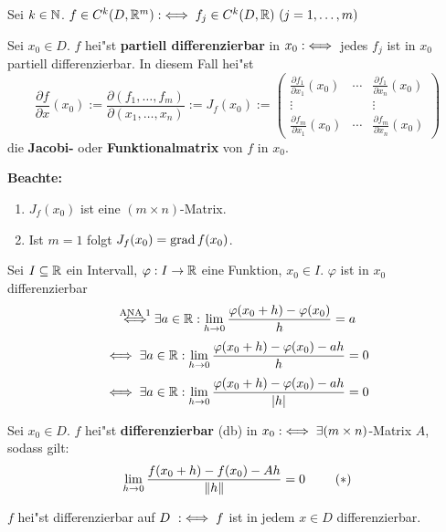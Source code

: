 \documentclass[a4paper,twoside,DIV15,BCOR12mm,chapterprefix=true,headings=twolinechapter]{scrbook}
\begin{document}
\begin{definition*}
\begin{liste}
\item Sei $k\in\mathbb{N}$. $f\in C^k(D,\MdR^m) :\equizu f_j\in C^k(D,\MdR)\ (j=1,\ldots,m)$
\item Sei $x_0\in D$. $f$ hei"st \textbf{partiell differenzierbar} in $x_0 :\iff$ jedes $f_j$ ist in $x_0$ partiell differenzierbar. In diesem Fall hei"st
$$\frac{\partial f}{\partial x}(x_0):=\frac{\partial(f_1,\ldots,f_m)}{\partial(x_1,\ldots,x_n)}:=J_f(x_0):=\begin{pmatrix}
\frac{\partial f_1}{\partial x_1}(x_0) & \cdots & \frac{\partial f_1}{\partial x_n}(x_0) \\
\vdots & & \vdots \\
\frac{\partial f_m}{\partial x_1}(x_0) & \cdots & \frac{\partial f_m}{\partial x_n}(x_0)
\end{pmatrix}$$
die \textbf{Jacobi-} oder \textbf{Funktionalmatrix} von $f$ in $x_0$.
\end{liste}
\textbf{Beachte:}
\begin{enumerate}
\item $J_f(x_0)$ ist eine $(m \times n)$-Matrix.
\item Ist $m=1$ folgt $J_f(x_0)=\mathop{\rm grad}\nolimits f(x_0)$.
\end{enumerate}
\end{definition*}

\begin{erinnerung}
Sei $I\subseteq\mathbb{R}$ ein Intervall, $\varphi:I\to\mathbb{R}$ eine Funktion, $x_0\in I$. $\varphi$ ist in $x_0$ differenzierbar
$$\overset{\text{ANA 1}}{\iff}\exists a \in\mathbb{R}: \displaystyle\lim_{h\to 0}\frac{\varphi(x_0+h)-\varphi(x_0)}{h}=a$$
$$\iff\exists a\in\mathbb{R}:\displaystyle\lim_{h\to 0}\frac{\varphi(x_0+h)-\varphi(x_0)-ah}{h}=0$$
$$\iff\exists a\in\mathbb{R}: \displaystyle\lim_{h\to 0}\frac{\varphi(x_0+h)-\varphi(x_0)-ah}{|h|}=0$$
\end{erinnerung}

\begin{definition*}
\begin{liste}
\item Sei $x_0\in D$. $f$ hei"st \textbf{differenzierbar} (db) in 
$x_0 :\iff \exists (m \times n)$-Matrix $A$, sodass gilt:
\begin{align*}
\displaystyle\lim_{h\to 0}\frac{f(x_0+h)-f(x_0)-Ah}{\|h\|}=0\ \tag{$*$}
\end{align*}
\item $f$ hei"st differenzierbar auf $D\ :\iff f$ ist in jedem $x\in D$ differenzierbar.
\end{liste}
\end{definition*}
\end{document}
